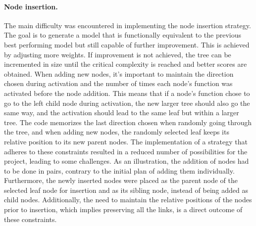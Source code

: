 \paragraph{Node insertion.}
The main difficulty was encountered in implementing the node insertion strategy. The goal is to generate a model that is functionally equivalent to the previous best performing model but still capable of further improvement. This is achieved by adjusting more weights. If improvement is not achieved, the tree can be incremented in size until the critical complexity is reached and better scores are obtained. When adding new nodes, it's important to maintain the direction chosen during activation and the number of times each node's function was activated before the node addition. This means that if a node's function chose to go to the left child node during activation, the new larger tree should also go the same way, and the activation should lead to the same leaf but within a larger tree. The code memorizes the last direction chosen when randomly going through the tree, and when adding new nodes, the randomly selected leaf keeps its relative position to its new parent nodes. The implementation of a strategy that adheres to these constraints resulted in a reduced number of possibilities for the project, leading to some challenges. As an illustration, the addition of nodes had to be done in pairs, contrary to the initial plan of adding them individually. Furthermore, the newly inserted nodes were placed as the parent node of the selected leaf node for insertion and as its sibling node, instead of being added as child nodes. Additionally, the need to maintain the relative positions of the nodes prior to insertion, which implies preserving all the links, is a direct outcome of these constraints.

